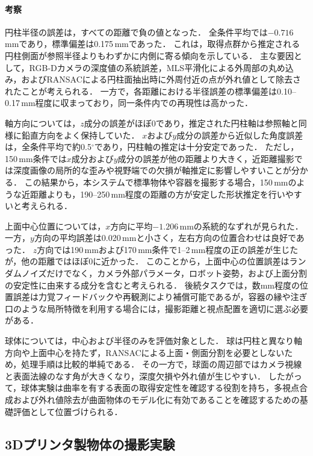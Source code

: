 \paragraph{考察}

円柱半径の誤差は，すべての距離で負の値となった．
全条件平均では$-0.716$\,mmであり，標準偏差は0.175\,mmであった．
これは，取得点群から推定される円柱側面が参照半径よりもわずかに内側に寄る傾向を示している．
主な要因として，RGB-Dカメラの深度値の系統誤差，MLS平滑化による外周部の丸め込み，およびRANSACによる円柱面抽出時に外周付近の点が外れ値として除去されたことが考えられる．
一方で，各距離における半径誤差の標準偏差は0.10--0.17\,mm程度に収まっており，同一条件内での再現性は高かった．

軸方向については，$z$成分の誤差がほぼ0であり，推定された円柱軸は参照軸と同様に鉛直方向をよく保持していた．
$x$および$y$成分の誤差から近似した角度誤差は，全条件平均で約0.5$^{\circ}$であり，円柱軸の推定は十分安定であった．
ただし，150\,mm条件では$x$成分および$y$成分の誤差が他の距離より大きく，近距離撮影では深度画像の局所的な歪みや視野端での欠損が軸推定に影響しやすいことが分かる．
この結果から，本システムで標準物体や容器を撮影する場合，150\,mmのような近距離よりも，190--250\,mm程度の距離の方が安定した形状推定を行いやすいと考えられる．

上面中心位置については，$x$方向に平均$-1.206$\,mmの系統的なずれが見られた．
一方，$y$方向の平均誤差は0.020\,mmと小さく，左右方向の位置合わせは良好であった．
$z$方向では190\,mmおよび170\,mm条件で1--2\,mm程度の正の誤差が生じたが，他の距離ではほぼ0に近かった．
このことから，上面中心の位置誤差はランダムノイズだけでなく，カメラ外部パラメータ，ロボット姿勢，および上面分割の安定性に由来する成分を含むと考えられる．
後続タスクでは，数mm程度の位置誤差は力覚フィードバックや再観測により補償可能であるが，容器の縁や注ぎ口のような局所特徴を利用する場合には，撮影距離と視点配置を適切に選ぶ必要がある．

球体については，中心および半径のみを評価対象とした．
球は円柱と異なり軸方向や上面中心を持たず，RANSACによる上面・側面分割を必要としないため，処理手順は比較的単純である．
その一方で，球面の周辺部ではカメラ視線と表面法線のなす角が大きくなり，深度欠損や外れ値が生じやすい．
したがって，球体実験は曲率を有する表面の取得安定性を確認する役割を持ち，多視点合成および外れ値除去が曲面物体のモデル化に有効であることを確認するための基礎評価として位置づけられる．

\subsection{3Dプリンタ製物体の撮影実験}
\label{sec:system:pointcloud:evaluation:3d-printed-object}

